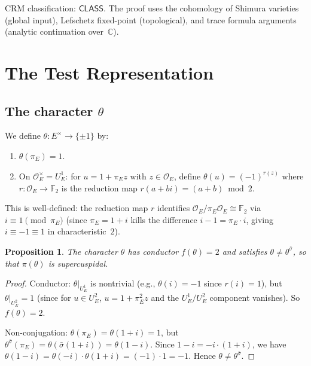 \documentclass[11pt]{article}
\theoremstyle{plain}
\newtheorem{proposition}[theorem]{Proposition}
\theoremstyle{definition}
\theoremstyle{remark}
\newcommand{\C}{\mathbb{C}}
\newcommand{\F}{\mathbb{F}}
\newcommand{\calO}{\mathcal{O}}
\newcommand{\CLASS}{\mathsf{CLASS}}
\begin{document}
\noindent
CRM classification: $\CLASS$.  The proof uses the
cohomology of Shimura varieties (global input),
Lefschetz fixed-point (topological), and trace formula
arguments (analytic continuation over~$\C$).

\section{The Test Representation}\label{sec:test}

\subsection{The character $\theta$}

We define $\theta : E^\times \to \{\pm 1\}$ by:
\begin{enumerate}[nosep]
\item $\theta(\pi_E) = 1$.
\item On $\calO_E^\times = U_E^1$: for $u = 1 + \pi_E z$
  with $z \in \calO_E$, define $\theta(u) = (-1)^{r(z)}$
  where $r : \calO_E \to \F_2$ is the reduction map
  $r(a + bi) = (a + b) \bmod 2$.
\end{enumerate}

This is well-defined: the reduction map $r$ identifies
$\calO_E / \pi_E\calO_E \cong \F_2$ via
$i \equiv 1 \pmod{\pi_E}$ (since $\pi_E = 1+i$ kills the
difference $i - 1 = \pi_E \cdot i$, giving $i \equiv -1
\equiv 1$ in characteristic~$2$).

\begin{proposition}\label{prop:theta}
The character $\theta$ has conductor $f(\theta) = 2$ and
satisfies $\theta \neq \theta^{\bar\sigma}$, so that
$\pi(\theta)$ is supercuspidal.
\end{proposition}
\begin{proof}
Conductor: $\theta|_{U_E^1}$ is nontrivial (e.g.,
$\theta(i) = -1$ since $r(i) = 1$), but
$\theta|_{U_E^2} = 1$ (since for $u \in U_E^2$,
$u = 1 + \pi_E^2 z$ and the $U_E^1/U_E^2$ component
vanishes).  So $f(\theta) = 2$.

Non-conjugation: $\theta(\pi_E) = \theta(1+i) = 1$, but
$\theta^{\bar\sigma}(\pi_E) = \theta(\bar\sigma(1+i))
= \theta(1-i)$.  Since $1-i = -i \cdot (1+i)$, we have
$\theta(1-i) = \theta(-i) \cdot \theta(1+i) = (-1) \cdot 1
= -1$.  Hence $\theta \neq \theta^{\bar\sigma}$.
\end{proof}
\end{document}
